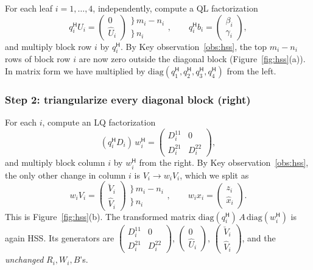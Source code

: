 \documentclass[11pt]{article}
\newcommand{\ct}{^{\mathsf H}}            %
\newcommand{\hU}{\widehat U}
\newcommand{\hV}{\widehat V}
\newcommand{\cV}{\breve V}
\newcommand{\hx}{\hat x}
\theoremstyle{definition}
\begin{document}
For each leaf $i=1,\dots,4$, independently, compute a QL factorization
\[
q_i\ct U_i = \begin{pmatrix} 0\\ \hU_i\end{pmatrix}
\begin{matrix}\}\,m_i-n_i\\ \}\,n_i\phantom{-m_i}\end{matrix},
\qquad
q_i\ct b_i = \begin{pmatrix} \beta_i\\ \gamma_i\end{pmatrix},
\]
and multiply block row $i$ by $q_i\ct$. By Key observation~\ref{obs:hss}, the top
$m_i-n_i$ rows of block row $i$ are now zero outside the diagonal block
(Figure~\ref{fig:hss}(a)). In matrix form we have multiplied by
$\mathrm{diag}(q_1\ct,q_2\ct,q_3\ct,q_4\ct)$ from the left.

\subsubsection*{Step 2: triangularize every diagonal block (right)}

For each $i$, compute an LQ factorization
\[
(q_i\ct D_i)\,w_i\ct = \begin{pmatrix} D_i^{11} & 0\\ D_i^{21} & D_i^{22}\end{pmatrix},
\]
and multiply block column $i$ by $w_i\ct$ from the right. By Key observation~\ref{obs:hss},
the only other change in column $i$ is $V_i\to w_iV_i$, which we split as
\[
w_iV_i = \begin{pmatrix} \cV_i\\ \hV_i\end{pmatrix}
\begin{matrix}\}\,m_i-n_i\\ \}\,n_i\phantom{-m_i}\end{matrix},
\qquad
w_ix_i = \begin{pmatrix} z_i\\ \hx_i\end{pmatrix}.
\]
This is Figure~\ref{fig:hss}(b). The transformed matrix
$\mathrm{diag}(q_i\ct)\,A\,\mathrm{diag}(w_i\ct)$ is again HSS. Its generators are
$\left(\begin{smallmatrix}D_i^{11}&0\\D_i^{21}&D_i^{22}\end{smallmatrix}\right)$,
$\left(\begin{smallmatrix}0\\\hU_i\end{smallmatrix}\right)$,
$\left(\begin{smallmatrix}\cV_i\\\hV_i\end{smallmatrix}\right)$, and the
\emph{unchanged} $R_i,W_i,B$'s.
\end{document}
